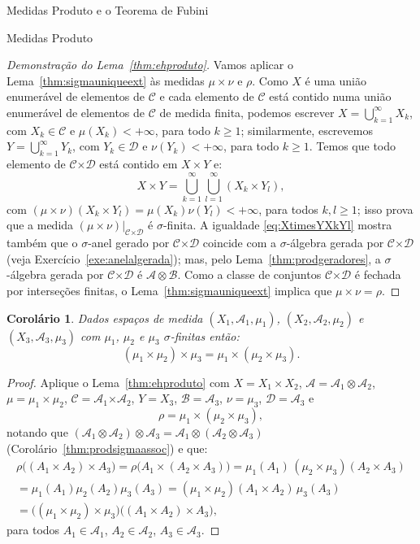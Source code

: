 \documentclass[oneside,final,11pt]{amsbook}
\newcommand{\Times}{\pmb{\times}}
\theoremstyle{remark}\newtheorem{exercise}{Exercício}[chapter]
\theoremstyle{remark}\newtheorem{*exercise}[exercise]{\hbox to 0pt{\hskip 0pt minus 1fil*}Exercício}
\theoremstyle{definition}\newtheorem{exdefin}{Definição}[chapter]
\theoremstyle{plain}\newtheorem{teo}{Teorema}[section]
\theoremstyle{plain}\newtheorem{lem}[teo]{Lema}
\theoremstyle{plain}\newtheorem{prop}[teo]{Proposição}
\theoremstyle{plain}\newtheorem{cor}[teo]{Corolário}
\theoremstyle{definition}\newtheorem{defin}[teo]{Definição}
\theoremstyle{remark}\newtheorem{rem}[teo]{Observação}
\theoremstyle{definition}\newtheorem{notation}[teo]{Notação}
\theoremstyle{definition}\newtheorem{convention}[teo]{Convenção}
\theoremstyle{definition}\newtheorem{example}[teo]{Exemplo}
\numberwithin{section}{chapter}
\numberwithin{equation}{section}
\begin{document}
\begin{chapter}{Medidas Produto e o Teorema de Fubini}
\begin{section}{Medidas Produto}
\begin{proof}[Demonstração do Lema~\ref{thm:ehproduto}]
Vamos aplicar o Lema~\ref{thm:sigmauniqueext} às medidas $\mu\times\nu$ e $\rho$. Como $X$ é uma união enumerável
de elementos de $\mathcal C$ e cada elemento de $\mathcal C$ está contido numa união enumerável de elementos
de $\mathcal C$ de medida finita, podemos escrever $X=\bigcup_{k=1}^\infty X_k$, com $X_k\in\mathcal C$ e $\mu(X_k)<+\infty$,
para todo $k\ge1$; similarmente, escrevemos $Y=\bigcup_{k=1}^\infty Y_k$, com $Y_k\in\mathcal D$ e $\nu(Y_k)<+\infty$,
para todo $k\ge1$. Temos que todo elemento de $\mathcal C\Times\mathcal D$ está contido em $X\times Y$ e:
\begin{equation}\label{eq:XtimesYXkYl}
X\times Y=\bigcup_{k=1}^\infty\bigcup_{l=1}^\infty(X_k\times Y_l),
\end{equation}
com $(\mu\times\nu)(X_k\times Y_l)=\mu(X_k)\nu(Y_l)<+\infty$, para todos $k,l\ge1$; isso prova que a medida
$(\mu\times\nu)\vert_{\mathcal C\Times\mathcal D}$ é $\sigma$-finita. A igualdade \eqref{eq:XtimesYXkYl} mostra
também que o $\sigma$-anel gerado por $\mathcal C\Times\mathcal D$ coincide com a $\sigma$-álgebra gerada por
$\mathcal C\Times\mathcal D$ (veja Exercício~\ref{exe:anelalgerada}); mas, pelo Lema~\ref{thm:prodgeradores},
a $\sigma$-álgebra gerada por $\mathcal C\Times\mathcal D$ é $\mathcal A\otimes\mathcal B$. Como a classe
de conjuntos $\mathcal C\Times\mathcal D$ é fechada por interseções finitas, o Lema~\ref{thm:sigmauniqueext}
implica que $\mu\times\nu=\rho$.
\end{proof}

\begin{cor}\label{thm:corprodmuassoc}
Dados espaços de medida $(X_1,\mathcal A_1,\mu_1)$, $(X_2,\mathcal A_2,\mu_2)$ e $(X_3,\mathcal A_3,\mu_3)$
com $\mu_1$, $\mu_2$ e $\mu_3$ $\sigma$-finitas então:
\[(\mu_1\times\mu_2)\times\mu_3=\mu_1\times(\mu_2\times\mu_3).\]
\end{cor}
\begin{proof}
Aplique o Lema~\ref{thm:ehproduto} com $X=X_1\times X_2$, $\mathcal A=\mathcal A_1\otimes\mathcal A_2$, $\mu=\mu_1\times\mu_2$,
$\mathcal C=\mathcal A_1\Times\mathcal A_2$, $Y=X_3$, $\mathcal B=\mathcal A_3$, $\nu=\mu_3$, $\mathcal D=\mathcal A_3$
e
\[\rho=\mu_1\times(\mu_2\times\mu_3),\]
notando que $(\mathcal A_1\otimes\mathcal A_2)\otimes\mathcal A_3=\mathcal A_1\otimes(\mathcal A_2\otimes\mathcal A_3)$
(Corolário~\ref{thm:prodsigmaassoc}) e que:
\begin{multline*}
\rho\big((A_1\times A_2)\times A_3\big)=\rho\big(A_1\times(A_2\times A_3)\big)=\mu_1(A_1)\,(\mu_2\times\mu_3)(A_2\times A_3)\\
=\mu_1(A_1)\mu_2(A_2)\mu_3(A_3)=(\mu_1\times\mu_2)(A_1\times A_2)\,\mu_3(A_3)\\
=\big((\mu_1\times\mu_2)\times\mu_3\big)\big((A_1\times A_2)\times A_3\big),
\end{multline*}
para todos $A_1\in\mathcal A_1$, $A_2\in\mathcal A_2$, $A_3\in\mathcal A_3$.
\end{proof}


\end{section}
\end{chapter}
\end{document}
